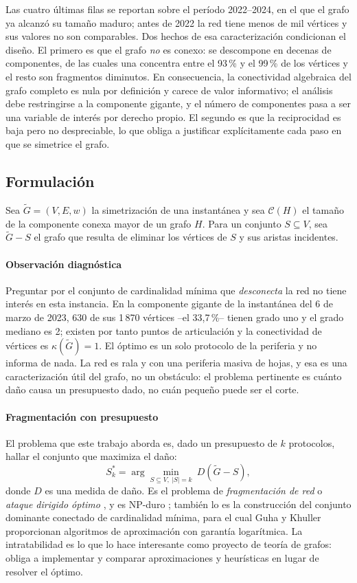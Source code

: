 \documentclass[journal]{IEEEtran}
\begin{document}
Las cuatro últimas filas se reportan sobre el período 2022--2024, en el que el
grafo ya alcanzó su tamaño maduro; antes de 2022 la red tiene menos de mil
vértices y sus valores no son comparables. Dos hechos de esa caracterización
condicionan el diseño. El primero es que el grafo \emph{no} es conexo: se
descompone en decenas de componentes, de las cuales una concentra entre el
93\,\% y el 99\,\% de los vértices y el resto son fragmentos diminutos. En consecuencia, la conectividad
algebraica del grafo completo es nula por definición y carece de valor
informativo; el análisis debe restringirse a la componente gigante, y el número de
componentes pasa a ser una variable de interés por derecho propio. El segundo es
que la reciprocidad es baja pero no despreciable, lo que obliga a justificar
explícitamente cada paso en que se simetrice el grafo.

\subsection{Formulación}

Sea $\tilde{G} = (V, E, w)$ la simetrización de una instantánea y sea
$\mathcal{C}(H)$ el tamaño de la componente conexa mayor de un grafo $H$. Para un
conjunto $S \subseteq V$, sea $\tilde{G} - S$ el grafo que resulta de eliminar los
vértices de $S$ y sus aristas incidentes.

\paragraph{Observación diagnóstica} Preguntar por el conjunto de cardinalidad
mínima que \emph{desconecta} la red no tiene interés en esta instancia. En la
componente gigante de la instantánea del 6 de marzo de 2023, 630 de sus 1\,870
vértices --el 33{,}7\,\%-- tienen grado uno y el grado mediano es 2; existen por
tanto puntos de articulación y la conectividad de vértices es
$\kappa(\tilde{G}) = 1$. El óptimo es un solo protocolo de la periferia y no
informa de nada. La red es rala y con una periferia masiva de hojas, y esa es una
caracterización útil del grafo, no un obstáculo: el problema pertinente es cuánto
daño causa un presupuesto dado, no cuán pequeño puede ser el corte.

\paragraph{Fragmentación con presupuesto} El problema que este trabajo aborda es,
dado un presupuesto de $k$ protocolos, hallar el conjunto que maximiza el daño:
\[
S^{\ast}_k = \arg\min_{S \subseteq V,\ |S| = k} \ D(\tilde{G} - S),
\]
donde $D$ es una medida de daño. Es el problema de \emph{fragmentación de red} o
\emph{ataque dirigido óptimo} \cite{albert2000error}, y es NP-duro
\cite{garey1979computers}; también lo es la construcción del conjunto dominante
conectado de cardinalidad mínima, para el cual Guha y Khuller
\cite{guha1998approximation} proporcionan algoritmos de aproximación con garantía
logarítmica. La intratabilidad es lo que lo hace interesante como proyecto de
teoría de grafos: obliga a implementar y comparar aproximaciones y heurísticas en
lugar de resolver el óptimo.
\end{document}
